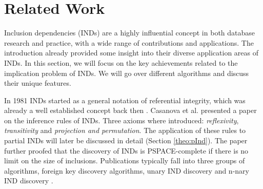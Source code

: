 \section{Related Work}

Inclusion dependencies (INDs) are a highly influential concept in both database research and practice, with a wide range of contributions and applications. The introduction already provided some insight into their diverse application areas of INDs. In this section, we will focus on the key achievements related to the implication problem of INDs. We will go over different algorithms and discuss their unique features.

In 1981 INDs started as a general notation of referential integrity, which was already a well established concept back then \cite{date1981referential}. Casanova et al. presented a paper on the inference rules of INDs\cite{casanova1982inclusion}. Three axioms where introduced: \textit{reflexivity}, \textit{transitivity} and \textit{projection and permutation}. The application of these rules to partial INDs will later be discussed in detail (Section \ref{theo:pInd}). The paper further proofed that the discovery of INDs is PSPACE-complete if there is no limit on the size of inclusions. Publications typically fall into three groups of algorithms, foreign key discovery algorithms, unary IND discovery and n-nary IND discovery \cite{papenbrock2017data}.

